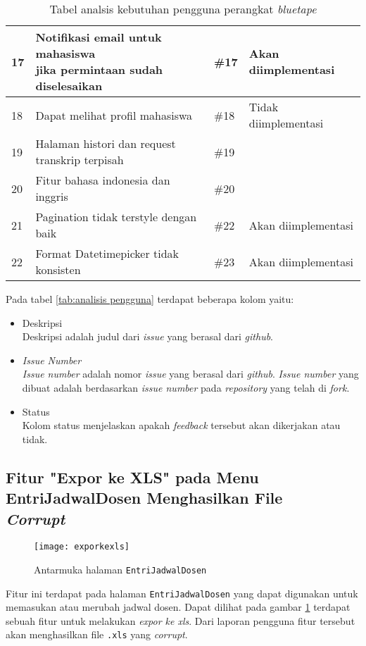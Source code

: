 \begin{table}[H]
{\begin{tabular}{|l|l|l|l|}
	17 & \makecell[l]{Notifikasi email untuk mahasiswa \\ jika permintaan sudah diselesaikan} & \#17 & Akan diimplementasi\\ \hline
	18 & Dapat melihat profil mahasiswa & \#18 & Tidak diimplementasi\\ \hline
	19 & Halaman histori dan request transkrip terpisah & \#19 & \\ \hline
	20 & Fitur bahasa indonesia dan inggris & \#20 & \\ \hline
	21 & Pagination tidak terstyle dengan baik & \#22 & Akan diimplementasi\\ \hline
	22 & Format Datetimepicker tidak konsisten &\#23 & Akan diimplementasi\\ \hline
	
	
	\end{tabular}}
	\caption{Tabel analsis kebutuhan pengguna perangkat \textit{bluetape}}
\end{table}

Pada tabel \ref{tab:analisis pengguna} terdapat beberapa kolom yaitu:
\begin{itemize}
	\item Deskripsi \\
	Deskripsi adalah judul dari \textit{issue} yang berasal dari \textit{github}.
	\item \textit{Issue Number} \\ \textit{Issue number} adalah nomor \textit{issue} yang berasal dari \textit{github}. \textit{Issue number} yang dibuat adalah berdasarkan \textit{issue number} pada \textit{repository} yang telah di \textit{fork}.
	\item Status \\
	Kolom status menjelaskan apakah \textit{feedback} tersebut akan dikerjakan atau tidak.
\end{itemize}

\subsection{Fitur "Expor ke XLS" pada Menu EntriJadwalDosen Menghasilkan File \\ \textit{Corrupt}}
\begin{figure}[H]
	\centering
	\texttt{[image: exporkexls]} 
	\caption{Antarmuka halaman \texttt{EntriJadwalDosen}}
	\label{fig:EntriJadwalDosen} 
\end{figure}

Fitur ini terdapat pada halaman \texttt{EntriJadwalDosen} yang dapat digunakan untuk memasukan atau merubah jadwal dosen. Dapat dilihat pada gambar \ref{fig:EntriJadwalDosen} terdapat sebuah fitur untuk melakukan \textit{expor ke xls}. Dari laporan pengguna fitur tersebut akan menghasilkan file \texttt{.xls} yang \textit{corrupt}. 

